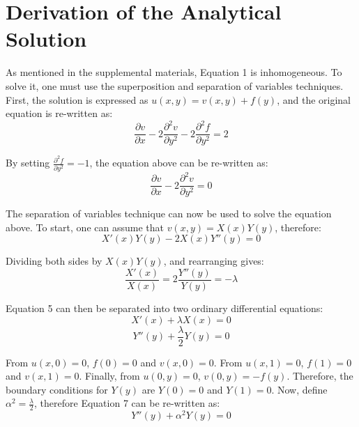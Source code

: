 \documentclass[letterpaper,12pt]{article}
\begin{document}
\section{Derivation of the Analytical Solution}

As mentioned in the supplemental materials, Equation 1 is inhomogeneous. To solve it, one must use the superposition and separation of variables techniques. First, the solution is expressed as $u(x,y) = v(x,y) + f(y)$, and the original equation is re-written as:
\begin{equation}
\frac{\partial v}{\partial x} - 2 \frac{\partial^2 v}{\partial y^2} - 2 \frac{\partial^2 f}{\partial y^2} = 2
\end{equation}

By setting $\frac{\partial^2 f}{\partial y^2} = -1 $, the equation above can be re-written as:
\begin{equation}
\frac{\partial v}{\partial x} - 2 \frac{\partial^2 v}{\partial y^2} = 0
\end{equation}

The separation of variables technique can now be used to solve the equation above. To start, one can assume that $v(x,y) = X(x)Y(y)$, therefore:
\begin{equation}
X'(x)Y(y) - 2X(x)Y''(y) = 0
\end{equation}

Dividing both sides by $X(x)Y(y)$, and rearranging gives:
\begin{equation}
\frac{X'(x)}{X(x)} = 2 \frac{Y''(y)}{Y(y)} = -\lambda
\end{equation}

Equation 5 can then be separated into two ordinary differential equations:
\begin{equation}
X'(x) + \lambda X(x) = 0
\end{equation}
\begin{equation}
Y''(y) + \frac{\lambda}{2} Y(y) = 0
\end{equation}

From $u(x,0) = 0$, $f(0) = 0$ and $v(x,0) = 0$. From $u(x,1) = 0$, $f(1) = 0$ and $v(x,1) = 0$. Finally, from $u(0,y) = 0$, $v(0,y) = -f(y)$. Therefore, the boundary conditions for $Y(y)$ are $Y(0) = 0$ and $Y(1) = 0$. Now, define $ \alpha ^2 = \frac{\lambda}{2}$, therefore Equation 7 can be re-written as:
\begin{equation}
Y''(y) + \alpha^2 Y(y) = 0
\end{equation}
\end{document}
